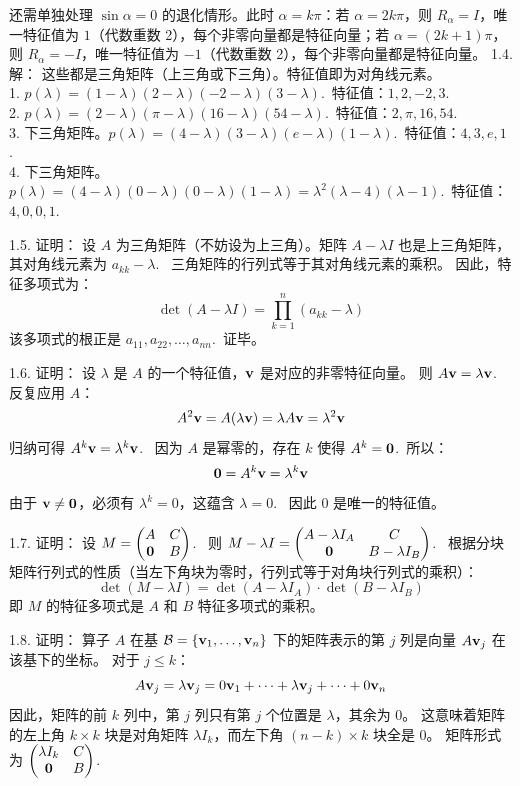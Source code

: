 \begin{exer}
还需单独处理 $\sin\alpha=0$ 的退化情形。此时 $\alpha=k\pi$：若 $\alpha=2k\pi$，则 $R_\alpha=I$，唯一特征值为 $1$（代数重数 2），每个非零向量都是特征向量；若 $\alpha=(2k+1)\pi$，则 $R_\alpha=-I$，唯一特征值为 $-1$（代数重数 2），每个非零向量都是特征向量。
1.4. 解：
这些都是三角矩阵（上三角或下三角）。特征值即为对角线元素。\\
1. $p(\lambda) = (1-\lambda)(2-\lambda)(-2-\lambda)(3-\lambda)$.~特征值：$1, 2, -2, 3$.~\\
2. $p(\lambda) = (2-\lambda)(\pi-\lambda)(16-\lambda)(54-\lambda)$.~特征值：$2, \pi, 16, 54$.~\\
3. 下三角矩阵。$p(\lambda) = (4-\lambda)(3-\lambda)(e-\lambda)(1-\lambda)$.~特征值：$4, 3, e, 1$.~\\
4. 下三角矩阵。$p(\lambda) = (4-\lambda)(0-\lambda)(0-\lambda)(1-\lambda) = \lambda^2(\lambda-4)(\lambda-1)$.~特征值：$4, 0, 0, 1$.~

1.5. 证明：
设 $A$ 为三角矩阵（不妨设为上三角）。矩阵 $A - \lambda I$ 也是上三角矩阵，其对角线元素为 $a_{kk} - \lambda$.~
三角矩阵的行列式等于其对角线元素的乘积。
因此，特征多项式为：
$$ \det(A - \lambda I) = \prod_{k=1}^n (a_{kk} - \lambda) $$
该多项式的根正是 $a_{11}, a_{22}, \dots, a_{nn}$.~证毕。

1.6. 证明：
设 $\lambda$ 是 $A$ 的一个特征值，$\mathbf{v}$ 是对应的非零特征向量。
则 $A\mathbf{v} = \lambda \mathbf{v}$.~
反复应用 $A$：
$$ A^2 \mathbf{v} = A(\lambda \mathbf{v}) = \lambda A\mathbf{v} = \lambda^2 \mathbf{v} $$
归纳可得 $A^k \mathbf{v} = \lambda^k \mathbf{v}$.~
因为 $A$ 是幂零的，存在 $k$ 使得 $A^k = \mathbf{0}$.~所以：
$$ \mathbf{0} = A^k \mathbf{v} = \lambda^k \mathbf{v} $$
由于 $\mathbf{v} \neq \mathbf{0}$，必须有 $\lambda^k = 0$，这蕴含 $\lambda = 0$.~
因此 0 是唯一的特征值。

1.7. 证明：
设 $M = \begin{pmatrix} A & C \\ \mathbf{0} & B \end{pmatrix}$.~
则 $M - \lambda I = \begin{pmatrix} A - \lambda I_A & C \\ \mathbf{0} & B - \lambda I_B \end{pmatrix}$.~
根据分块矩阵行列式的性质（当左下角块为零时，行列式等于对角块行列式的乘积）：
$$ \det(M - \lambda I) = \det(A - \lambda I_A) \cdot \det(B - \lambda I_B) $$
即 $M$ 的特征多项式是 $A$ 和 $B$ 特征多项式的乘积。

1.8. 证明：
算子 $A$ 在基 $\mathcal{B}  = \{\mathbf{v}_1, \dots, \mathbf{v}_n\}$ 下的矩阵表示的第 $j$ 列是向量 $A\mathbf{v}_j$ 在该基下的坐标。
对于 $j \le k$：
$$ A\mathbf{v}_j = \lambda \mathbf{v}_j = 0\mathbf{v}_1 + \dots + \lambda \mathbf{v}_j + \dots + 0\mathbf{v}_n $$
因此，矩阵的前 $k$ 列中，第 $j$ 列只有第 $j$ 个位置是 $\lambda$，其余为 0。
这意味着矩阵的左上角 $k \times k$ 块是对角矩阵 $\lambda I_k$，而左下角 $(n-k) \times k$ 块全是 0。
矩阵形式为 $\begin{pmatrix} \lambda I_k & C \\ \mathbf{0} & B \end{pmatrix}$.~


\end{exer}
